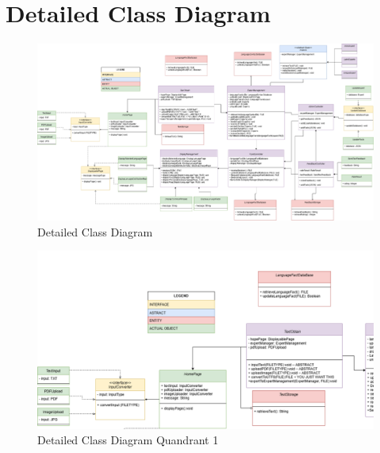 \section{Detailed Class Diagram}
\label{sec:detailed_class_diagram}

\begin{figure}[H]
	\centering
	\includegraphics[width=\textwidth, height=\textheight, keepaspectratio]{Section4/images/LangufiyClassDiagramV5.png}
	\caption{Detailed Class Diagram}
	\label{DetailedClassDiagram}
\end{figure}

\begin{figure}[H]
	\centering
	\includegraphics[width=\textwidth, height=\textheight, keepaspectratio]{Section4/images/LangufiyClassDiagramV5Q1.png}
	\caption{Detailed Class Diagram Quandrant 1}
	\label{DetailedClassDiagramQ1}
\end{figure}

